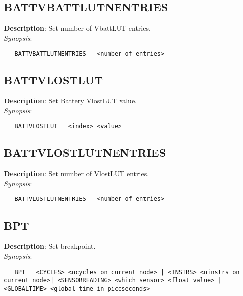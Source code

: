 \subsection{\bf BATTVBATTLUTNENTRIES}
\label{manpages:BATTVBATTLUTNENTRIES}
\label{manpages:battvbattlutnentries}
\vspace{-0.2in}
{\bf Description}: 	Set number of VbattLUT entries.\\[1.5ex]
{\em Synopsis}:
\vspace{-0.2in}
\scriptsize
\begin{verbatim}
   BATTVBATTLUTNENTRIES   <number of entries>			
\end{verbatim}
\normalsize
\vspace{-0.2in}


\subsection{\bf BATTVLOSTLUT}
\label{manpages:BATTVLOSTLUT}
\label{manpages:battvlostlut}
\vspace{-0.2in}
{\bf Description}: 	Set Battery VlostLUT value.\\[1.5ex]
{\em Synopsis}:
\vspace{-0.2in}
\scriptsize
\begin{verbatim}
   BATTVLOSTLUT   <index> <value>				
\end{verbatim}
\normalsize
\vspace{-0.2in}


\subsection{\bf BATTVLOSTLUTNENTRIES}
\label{manpages:BATTVLOSTLUTNENTRIES}
\label{manpages:battvlostlutnentries}
\vspace{-0.2in}
{\bf Description}: 	Set number of VlostLUT entries.\\[1.5ex]
{\em Synopsis}:
\vspace{-0.2in}
\scriptsize
\begin{verbatim}
   BATTVLOSTLUTNENTRIES   <number of entries>			
\end{verbatim}
\normalsize
\vspace{-0.2in}


\subsection{\bf BPT}
\label{manpages:BPT}
\label{manpages:bpt}
\vspace{-0.2in}
{\bf Description}: 	Set breakpoint.\\[1.5ex]
{\em Synopsis}:
\vspace{-0.2in}
\scriptsize
\begin{verbatim}
   BPT   <CYCLES> <ncycles on current node> | <INSTRS> <ninstrs on current node>| <SENSORREADING> <which sensor> <float value> | <GLOBALTIME> <global time in picoseconds> 
\end{verbatim}
\normalsize
\vspace{-0.2in}



